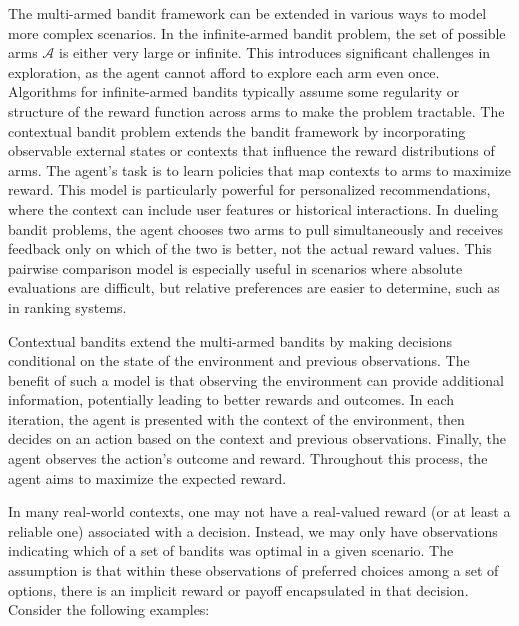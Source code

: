 \documentclass[
  letterpaper,
  numbers=noenddot,
  DIV=11]{scrreprt}
\theoremstyle{plain}
\theoremstyle{definition}
\theoremstyle{plain}
\theoremstyle{remark}
\begin{document}
The multi-armed bandit framework can be extended in various ways to
model more complex scenarios. In the infinite-armed bandit problem, the
set of possible arms \(\mathcal{A}\) is either very large or infinite.
This introduces significant challenges in exploration, as the agent
cannot afford to explore each arm even once. Algorithms for
infinite-armed bandits typically assume some regularity or structure of
the reward function across arms to make the problem tractable. The
contextual bandit problem extends the bandit framework by incorporating
observable external states or contexts that influence the reward
distributions of arms. The agent's task is to learn policies that map
contexts to arms to maximize reward. This model is particularly powerful
for personalized recommendations, where the context can include user
features or historical interactions. In dueling bandit problems, the
agent chooses two arms to pull simultaneously and receives feedback only
on which of the two is better, not the actual reward values. This
pairwise comparison model is especially useful in scenarios where
absolute evaluations are difficult, but relative preferences are easier
to determine, such as in ranking systems.

Contextual bandits extend the multi-armed bandits by making decisions
conditional on the state of the environment and previous observations.
The benefit of such a model is that observing the environment can
provide additional information, potentially leading to better rewards
and outcomes. In each iteration, the agent is presented with the context
of the environment, then decides on an action based on the context and
previous observations. Finally, the agent observes the action's outcome
and reward. Throughout this process, the agent aims to maximize the
expected reward.

In many real-world contexts, one may not have a real-valued reward (or
at least a reliable one) associated with a decision. Instead, we may
only have observations indicating which of a set of bandits was optimal
in a given scenario. The assumption is that within these observations of
preferred choices among a set of options, there is an implicit reward or
payoff encapsulated in that decision. Consider the following examples:
\end{document}
